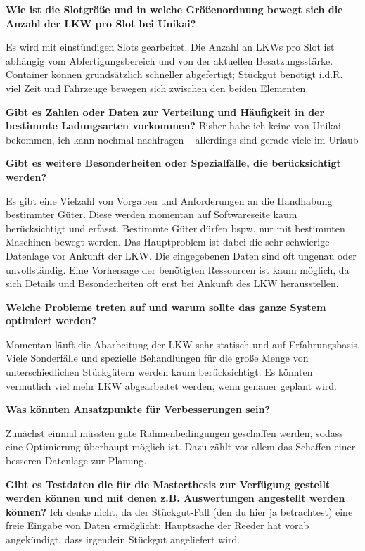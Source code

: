 \textbf{Wie ist die Slotgröße und in welche Größenordnung bewegt sich die Anzahl der LKW pro Slot bei Unikai?}

Es wird mit einstündigen Slots gearbeitet. Die Anzahl an LKWs pro Slot ist abhängig vom Abfertigungsbereich und von der aktuellen Besatzungsstärke. Container können grundsätzlich schneller abgefertigt; Stückgut benötigt i.d.R. viel Zeit und Fahrzeuge bewegen sich zwischen den beiden Elementen.

\textbf{Gibt es Zahlen oder Daten zur Verteilung und Häufigkeit in der bestimmte Ladungsarten vorkommen?}
Bisher habe ich keine von Unikai bekommen, ich kann nochmal nachfragen – allerdings sind gerade viele im Urlaub

\textbf{Gibt es weitere Besonderheiten oder Spezialfälle, die berücksichtigt werden?}

Es gibt eine Vielzahl von Vorgaben und Anforderungen an die Handhabung bestimmter Güter. Diese werden momentan auf Softwareseite kaum berücksichtigt und erfasst. Bestimmte Güter dürfen bspw. nur mit bestimmten Maschinen bewegt werden. Das Hauptproblem ist dabei die sehr schwierige Datenlage vor Ankunft der LKW. Die eingegebenen Daten sind oft ungenau oder unvollständig. Eine Vorhersage der benötigten Ressourcen ist kaum möglich, da sich Details und Besonderheiten oft erst bei Ankunft des LKW herausstellen.

\textbf{Welche Probleme treten auf und warum sollte das ganze System optimiert werden?}

Momentan läuft die Abarbeitung der LKW sehr statisch und auf Erfahrungsbasis. Viele Sonderfälle und spezielle Behandlungen für die große Menge von unterschiedlichen Stückgütern werden kaum berücksichtigt. Es könnten vermutlich viel mehr LKW abgearbeitet werden, wenn genauer geplant wird.

\textbf{Was könnten Ansatzpunkte für Verbesserungen sein?}

Zunächst einmal müssten gute Rahmenbedingungen geschaffen werden, sodass eine Optimierung überhaupt möglich ist. Dazu zählt vor allem das Schaffen einer besseren Datenlage zur Planung.

\textbf{Gibt es Testdaten die für die Masterthesis zur Verfügung gestellt werden können und mit denen z.B. Auswertungen angestellt werden können?}
Ich denke nicht, da der Stückgut-Fall (den du hier ja betrachtest) eine freie Eingabe von Daten ermöglicht; Hauptsache der Reeder hat vorab angekündigt, dass irgendein Stückgut angeliefert wird. 

